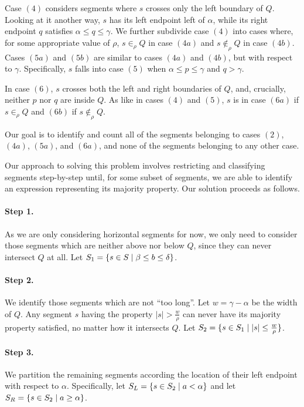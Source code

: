 Case $(4)$ considers segments where $s$ crosses only the left boundary of $Q$. 
Looking at it another way, $s$ has its left endpoint left of $\alpha$, while its right endpoint $q$ satisfies $\alpha \leq q \leq \gamma$.  
We further subdivide case $(4)$ into cases where, for some appropriate value of $\rho$, $s \in_\rho Q$ in case $(4a)$ and $s \not \in_\rho Q$ in case $(4b)$.
Cases $(5a)$ and $(5b)$ are similar to cases $(4a)$ and $(4b)$, but with respect to $\gamma$. 
Specifically, $s$ falls into case $(5)$ when $\alpha \leq p \leq \gamma$ and $q > \gamma$. 

In case $(6)$, $s$ crosses both the left and right boundaries of $Q$, and, crucially, neither $p$ nor $q$ are inside $Q$. As like in cases $(4)$ and $(5)$, $s$ is in case $(6a)$ if $s \in_\rho Q$ and $(6b)$ if $s \not \in_\rho Q$.

Our goal is to identify and count all of the segments belonging to cases $(2)$, $(4a)$, $(5a)$, and $(6a)$, and none of the segments belonging to any other case.

Our approach to solving this problem involves restricting and classifying segments step-by-step until, for some subset of segments, we are able to identify an expression representing its majority property.  Our solution proceeds as follows.

\paragraph{Step 1.} As we are only considering horizontal segments for now, we only need to consider those segments which are neither above nor below $Q$, since they can never intersect $Q$ at all. Let $S_1 = \{ s \in S \;|\; \beta \leq b \leq \delta\}$. 

\paragraph{Step 2.} We identify those segments which are not ``too long''.  Let $w = \gamma - \alpha$ be the width of $Q$.  Any segment $s$ having the property $|s| > \frac{w}{\rho}$ can never have its majority property satisfied, no matter how it intersects $Q$.  Let $S_2 = \{ s \in S_1 \;|\; |s| \leq \frac{w}{\rho} \}$.

\paragraph{Step 3.} We partition the remaining segments according the location of their left endpoint with respect to $\alpha$.
Specifically, let $S_L = \{s \in S_2 \;|\; a < \alpha \}$ and let $S_R = \{ s \in S_2 \;|\; a \geq \alpha \}$.

